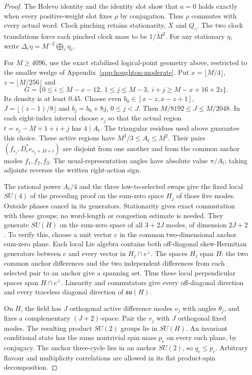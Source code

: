 \begin{proof}
The Holevo identity and the identity slot show that $a=0$ holds
exactly when every positive-weight slot fixes $\rho$ by conjugation.
Thus $\rho$ commutes with every actual word. Clock pinching retains
stationarity, $X$ and $Q_\gamma$. The two clock translations force
each pinched clock mass to be $1/M^2$. For any stationary $\eta$,
write $\Delta_c\eta=M^{-2}\bigoplus_c\eta_c$.

For $M\geq4096$, use the exact stabilized logical-point geometry
above, restricted to the smaller wedge of
Appendix~\ref{app:houghton-moderate}. Put $x=\lfloor M/4\rfloor$,
$z=\lfloor M/256\rfloor$ and
\[
 G=\{0\leq i\leq M-x-12,\ 1\leq j\leq M-3,
                      \ i+j\geq M-x+16+2z\}.
\]
Its density is at least $0.45$. Choose even
$b_0\in[x-z,x-z+1]$, $J=\lfloor(z-1)/8\rfloor$ and
$b_j=b_0+8j$, $0\leq j<J$. Then $M/8192\leq J\leq M/2048$.
In each eight-index interval choose $s_j$ so that the actual region
$t=s_j-M+1+i+j$ has $4\mid A_t$.
The triangular residues used above guarantee this choice.
These active regions have $M^2/3\leq A_t\leq M^2$.
Their pairs $(f_{s_j},D_c^*e_{s_j+M+i})$ are disjoint from one
another and from the common anchor modes $f_1,f_2,f_3$.
The usual-representation angles have absolute value $\pi/A_t$;
taking adjoints reverses the written right-action sign.

The rational power $A_t/4$ and the three low-to-selected swaps
give the fixed local $SU(4)$ of the preceding proof on the sum-zero
space $H_j$ of those five modes. Outside phases cancel in its
generators. Stationarity gives exact commutation with these groups;
no word-length or congestion estimate is needed.
They generate $SU(H)$ on the sum-zero space of all $3+2J$ modes,
of dimension $2J+2$. To verify this, choose a unit vector $e$ in the
common two-dimensional anchor sum-zero plane. Each local Lie algebra
contains both off-diagonal skew-Hermitian generators between $e$ and
every vector in $H_j\cap e^\perp$. The spaces $H_j$ span $H$:
the two common anchor differences and the two independent differences
from each selected pair to an anchor give a spanning set.
Thus these local perpendicular spaces span $H\cap e^\perp$.
Linearity and commutators give every off-diagonal direction and every
traceless diagonal direction of $\mathfrak{su}(H)$.

On $H$, the field has $J$ orthogonal active difference modes $v_j$
with angles $\theta_j$, and fixes a complementary $(J+2)$-space.
Pair the $v_j$ with $J$ orthogonal fixed modes. The resulting product
$SU(2)$ groups lie in $SU(H)$. An invariant conditional state has
the same nontrivial spin mass $p_c$ on every such plane, by conjugacy.
The anchor three-cycle lies in an anchor $SU(2)$, so
$q_c\leq p_c$. Arbitrary flavour and multiplicity correlations are
allowed in its flat product-spin decomposition.


\end{proof}
